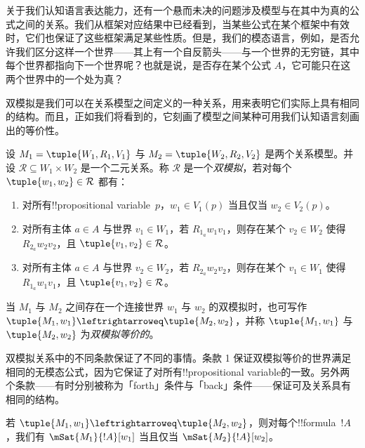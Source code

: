 \documentclass[../../../include/open-logic-section]{subfiles}
\begin{document}


关于我们认知语言表达能力，还有一个悬而未决的问题涉及模型与在其中为真的公式之间的关系。我们从框架对应结果中已经看到，当某些公式在某个框架中有效时，它们也保证了这些框架满足某些性质。但是，我们的模态语言，例如，是否允许我们区分这样一个世界——其上有一个自反箭头——与一个世界的无穷链，其中每个世界都指向下一个世界呢？也就是说，是否存在某个公式 $A$，它可能只在这两个世界中的一个处为真？

双模拟是我们可以在关系模型之间定义的一种关系，用来表明它们实际上具有相同的结构。而且，正如我们将看到的，它刻画了模型之间某种可用我们认知语言刻画出的等价性。

\begin{defn}[双模拟]
设 $M_1 = \tuple{W_1, R_1, V_1}$ 与 $M_2 = \tuple{W_2, R_2, V_2}$ 是两个关系模型。并设 $\mathcal{R} \subseteq W_1 \times W_2$ 是一个二元关系。称 $\mathcal{R}$ 是一个\emph{双模拟}，若对每个 $\tuple{w_1, w_2} \in \mathcal{R}$ 都有：

\begin{enumerate}
  \item 对所有!!{propositional variable}~$p$，$w_1 \in V_1(p)$ 当且仅当 $w_2 \in V_2(p)$。
  \item 对所有主体 $a \in A$ 与世界 $v_1 \in W_1$，若 $R_{1_a} w_1 v_1$，则存在某个 $v_2 \in W_2$ 使得 $R_{2_a} w_2 v_2$，且 $\tuple{v_1, v_2} \in \mathcal{R}$。
  \item 对所有主体 $a \in A$ 与世界 $v_2 \in W_2$，若 $R_{2_a} w_2 v_2$，则存在某个 $v_1 \in W_1$ 使得 $R_{1_a} w_1 v_1$，且 $\tuple{v_1, v_2} \in \mathcal{R}$。
\end{enumerate}

当 $M_1$ 与 $M_2$ 之间存在一个连接世界 $w_1$ 与 $w_2$ 的双模拟时，也可写作 $\tuple{M_1, w_1} \leftrightarroweq \tuple{M_2, w_2}$，并称 $\tuple{M_1, w_1}$ 与 $\tuple{M_2, w_2}$ 为\emph{双模拟等价的}。
\end{defn}

双模拟关系中的不同条款保证了不同的事情。条款 1 保证双模拟等价的世界满足相同的无模态公式，因为它保证了对所有!!{propositional variable}的一致。另外两个条款——有时分别被称为「forth」条件与「back」条件——保证可及关系具有相同的结构。

\begin{thm}
若 $\tuple{M_1, w_1} \leftrightarroweq \tuple{M_2, w_2}$，则对每个!!{formula}~$!A$，我们有 $\mSat{M_1}{!A}[w_1]$ 当且仅当 $\mSat{M_2}{!A}[w_2]$。
\end{thm}
\end{document}
